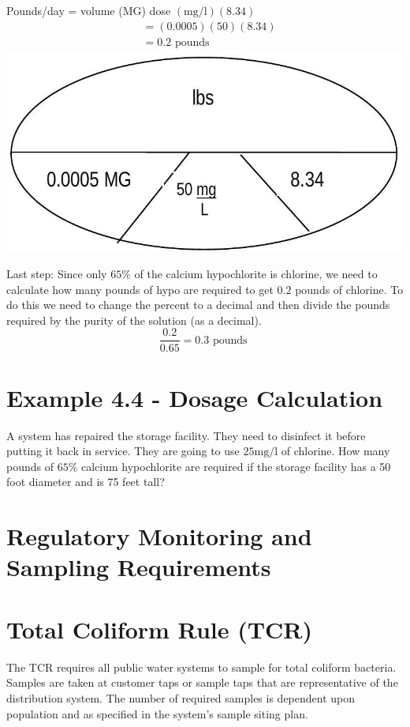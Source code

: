 \documentclass[10pt]{article}
\begin{document}
Pounds/day = volume (MG) dose $(\mathrm{mg} / \mathrm{l})(8.34)$
$$
\begin{aligned}
&=(0.0005)(50)(8.34) \\
&=0.2 \text { pounds }
\end{aligned}
$$
\includegraphics[max width=\textwidth]{2022_10_30_098bb5f44c5986ff92a9g-70}

Last step: Since only $65 \%$ of the calcium hypochlorite is chlorine, we need to calculate how many pounds of hypo are required to get $0.2$ pounds of chlorine. To do this we need to change the percent to a decimal and then divide the pounds required by the purity of the solution (as a decimal).
$$
\frac{0.2}{0.65}=0.3 \text { pounds }
$$

\section{Example 4.4 - Dosage Calculation}
A system has repaired the storage facility. They need to disinfect it before putting it back in service. They are going to use $25 \mathrm{mg} / \mathrm{l}$ of chlorine. How many pounds of $65 \%$ calcium hypochlorite are required if the storage facility has a 50 foot diameter and is 75 feet tall?

\section{Regulatory Monitoring and Sampling Requirements}
\section{Total Coliform Rule (TCR)}
The TCR requires all public water systems to sample for total coliform bacteria. Samples are taken at customer taps or sample taps that are representative of the distribution system. The number of required samples is dependent upon population and as specified in the system's sample siting plan.
\end{document}
